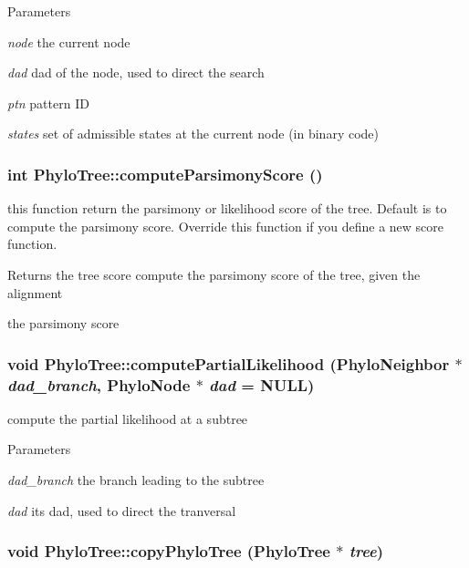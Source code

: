 \begin{DoxyParams}{Parameters}
\item[{\em node}]the current node \item[{\em dad}]dad of the node, used to direct the search \item[{\em ptn}]pattern ID \item[{\em states}]set of admissible states at the current node (in binary code) \end{DoxyParams}
\hypertarget{classPhyloTree_a106e4c54e0e3e8d48d3922d205941e60}{
\subsubsection[{computeParsimonyScore}]{\setlength{\rightskip}{0pt plus 5cm}int PhyloTree::computeParsimonyScore ()}}
\label{classPhyloTree_a106e4c54e0e3e8d48d3922d205941e60}
this function return the parsimony or likelihood score of the tree. Default is to compute the parsimony score. Override this function if you define a new score function. \begin{DoxyReturn}{Returns}
the tree score compute the parsimony score of the tree, given the alignment 

the parsimony score 
\end{DoxyReturn}
\hypertarget{classPhyloTree_a1c65fd0bcc5b433e6dd4781432aaaccd}{
\subsubsection[{computePartialLikelihood}]{\setlength{\rightskip}{0pt plus 5cm}void PhyloTree::computePartialLikelihood ({\bf PhyloNeighbor} $\ast$ {\em dad\_\-branch}, \/  {\bf PhyloNode} $\ast$ {\em dad} = {\ttfamily NULL})}}
\label{classPhyloTree_a1c65fd0bcc5b433e6dd4781432aaaccd}
compute the partial likelihood at a subtree 
\begin{DoxyParams}{Parameters}
\item[{\em dad\_\-branch}]the branch leading to the subtree \item[{\em dad}]its dad, used to direct the tranversal \end{DoxyParams}
\hypertarget{classPhyloTree_a195bfdd19700eb12a6680ced3bc5193b}{
\subsubsection[{copyPhyloTree}]{\setlength{\rightskip}{0pt plus 5cm}void PhyloTree::copyPhyloTree ({\bf PhyloTree} $\ast$ {\em tree})}}
